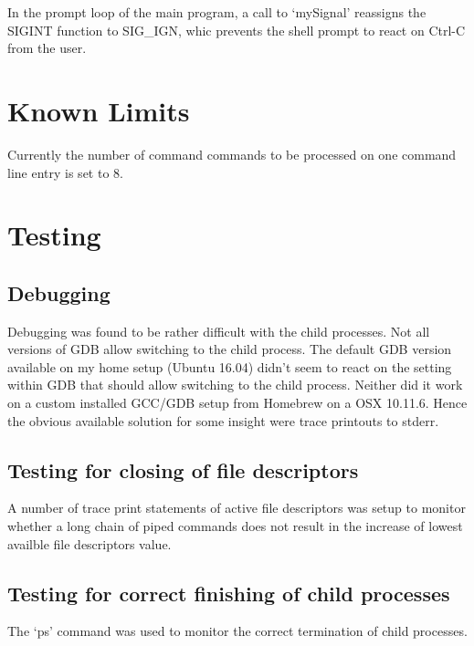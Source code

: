 \documentclass[a4paper,11pt,twoside]{article}
\begin{document}
In the prompt loop of the main program, a call to `mySignal' reassigns the SIGINT function to SIG_IGN, whic prevents the shell prompt to react on Ctrl-C from the user.  


\section{Known Limits}
Currently the number of command commands to be processed on one command line entry is set to 8. 

\section{Testing}

\subsection{Debugging}
Debugging was found to be rather difficult with the child processes. Not all versions of GDB allow switching to the child process. The default GDB version available on my home setup (Ubuntu 16.04) didn't seem to react on the setting within GDB that should allow switching to the child process. Neither did it work on a custom installed GCC/GDB setup from Homebrew on a OSX 10.11.6. Hence the obvious available solution for some insight were trace printouts to stderr. 

\subsection{Testing for closing of file descriptors}
A number of trace print statements of active file descriptors was setup to monitor whether a long chain of piped commands does not result in the increase of lowest availble file descriptors value.

\subsection{Testing for correct finishing of child processes}
The `ps' command was used to monitor the correct termination of child processes. 


\end{document}
